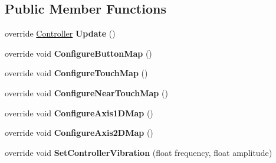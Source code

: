 \subsection*{Public Member Functions}
\begin{DoxyCompactItemize}
\item 
\mbox{\label{class_o_v_r_input_1_1_o_v_r_controller_gamepad_mac_a82446a4c83637a3bea9a3aea6320b027}} 
override \mbox{\hyperlink{class_o_v_r_input_a5c86f9052a9cbb0b73779ff5704d60a8}{Controller}} {\bfseries Update} ()
\item 
\mbox{\label{class_o_v_r_input_1_1_o_v_r_controller_gamepad_mac_ae766a477a4668ec2fe4837e7a3b3bde9}} 
override void {\bfseries Configure\+Button\+Map} ()
\item 
\mbox{\label{class_o_v_r_input_1_1_o_v_r_controller_gamepad_mac_a55618bcc975ac8290aaff2c3d481427d}} 
override void {\bfseries Configure\+Touch\+Map} ()
\item 
\mbox{\label{class_o_v_r_input_1_1_o_v_r_controller_gamepad_mac_ad03b57f82bc628e3c4c219b275e885af}} 
override void {\bfseries Configure\+Near\+Touch\+Map} ()
\item 
\mbox{\label{class_o_v_r_input_1_1_o_v_r_controller_gamepad_mac_a9f3f66c1278ce136424954160d6db4f1}} 
override void {\bfseries Configure\+Axis1\+D\+Map} ()
\item 
\mbox{\label{class_o_v_r_input_1_1_o_v_r_controller_gamepad_mac_a5b64e89cdba96213603587a0c204f96a}} 
override void {\bfseries Configure\+Axis2\+D\+Map} ()
\item 
\mbox{\label{class_o_v_r_input_1_1_o_v_r_controller_gamepad_mac_ac4b35dd54c4ce922b0f7348bb29d9029}} 
override void {\bfseries Set\+Controller\+Vibration} (float frequency, float amplitude)
\end{DoxyCompactItemize}

